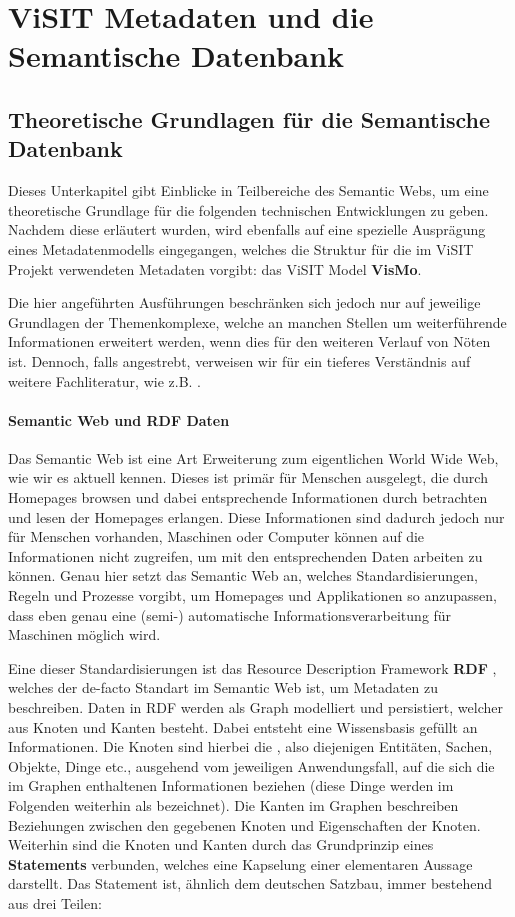 \section{ViSIT Metadaten und die Semantische Datenbank}\label{sec:semantics}

\subsection{Theoretische Grundlagen für die Semantische Datenbank}\label{sec:theoreticalBackground}

Dieses Unterkapitel gibt Einblicke in Teilbereiche des Semantic Webs, um eine theoretische Grundlage für die folgenden technischen Entwicklungen zu geben. Nachdem diese erläutert wurden, wird ebenfalls auf eine spezielle Ausprägung eines Metadatenmodells eingegangen, welches die Struktur für die im ViSIT Projekt verwendeten Metadaten vorgibt: das ViSIT Model \textbf{VisMo}.

Die hier angeführten Ausführungen beschränken sich jedoch nur auf jeweilige Grundlagen der Themenkomplexe, welche an manchen Stellen um weiterführende Informationen erweitert werden, wenn dies für den weiteren Verlauf von Nöten ist. Dennoch, falls angestrebt, verweisen wir für ein tieferes Verständnis auf weitere Fachliteratur, wie z.B. \cite{Hitzler-SemanticWeb-2007}.

\paragraph{Semantic Web und RDF Daten}

Das Semantic Web ist eine Art Erweiterung zum eigentlichen World Wide Web, wie wir es aktuell kennen. Dieses ist primär für Menschen ausgelegt, die durch Homepages browsen und dabei entsprechende Informationen durch betrachten und lesen der Homepages erlangen. Diese Informationen sind dadurch jedoch nur für Menschen vorhanden, Maschinen oder Computer können auf die Informationen nicht zugreifen, um mit den entsprechenden Daten arbeiten zu können. Genau hier setzt das Semantic Web an, welches Standardisierungen, Regeln und Prozesse vorgibt, um Homepages und Applikationen so anzupassen, dass eben genau eine (semi-) automatische Informationsverarbeitung für Maschinen möglich wird.
 
Eine dieser Standardisierungen ist das Resource Description Framework \textbf{RDF} \cite{Manola-RDFPrimer1.0-2004}, welches der de-facto Standart im Semantic Web ist, um Metadaten zu beschreiben. Daten in RDF werden als Graph modelliert und persistiert, welcher aus Knoten und Kanten besteht. Dabei entsteht eine Wissensbasis gefüllt an Informationen. Die Knoten sind hierbei die , also diejenigen Entitäten, Sachen, Objekte, Dinge etc., ausgehend vom jeweiligen Anwendungsfall, auf die sich die im Graphen enthaltenen Informationen beziehen (diese Dinge werden im Folgenden weiterhin als  bezeichnet). Die Kanten im Graphen beschreiben Beziehungen zwischen den gegebenen Knoten und Eigenschaften der Knoten. Weiterhin sind die Knoten und Kanten durch das Grundprinzip eines \textbf{Statements} verbunden, welches eine Kapselung einer elementaren Aussage darstellt. Das Statement ist, ähnlich dem deutschen Satzbau, immer bestehend aus drei Teilen:

